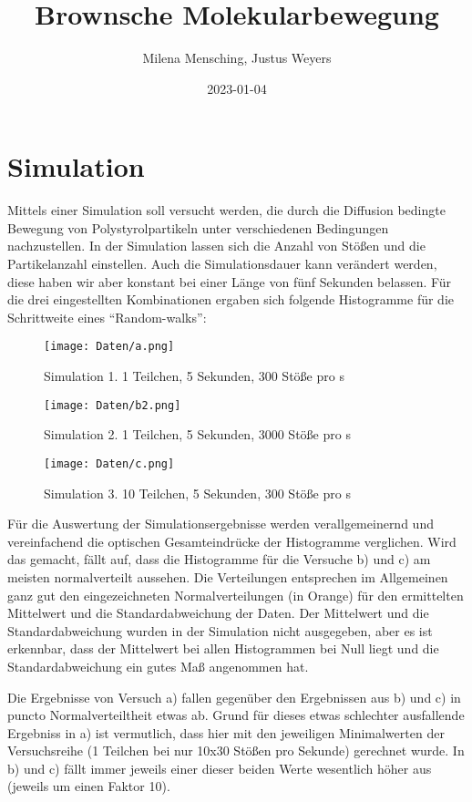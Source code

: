 \documentclass[class=article, crop=false]{standalone}
\title{Brownsche Molekularbewegung}
\author{Milena Mensching, Justus Weyers}
\date{2023-01-04}
\begin{document}
\hypertarget{simulation}{%
\section{Simulation}\label{simulation}}

Mittels einer Simulation soll versucht werden, die durch die Diffusion
bedingte Bewegung von Polystyrolpartikeln unter verschiedenen
Bedingungen nachzustellen. In der Simulation lassen sich die Anzahl von
Stößen und die Partikelanzahl einstellen. Auch die Simulationsdauer kann
verändert werden, diese haben wir aber konstant bei einer Länge von fünf
Sekunden belassen. Für die drei eingestellten Kombinationen ergaben sich
folgende Histogramme für die Schrittweite eines ``Random-walks'':

\begin{figure}
\centering
\texttt{[image: Daten/a.png]}
\caption{Simulation 1. 1 Teilchen, 5 Sekunden, 300 Stöße pro s}
\end{figure}

\begin{figure}
\centering
\texttt{[image: Daten/b2.png]}
\caption{Simulation 2. 1 Teilchen, 5 Sekunden, 3000 Stöße pro s}
\end{figure}

\begin{figure}
\centering
\texttt{[image: Daten/c.png]}
\caption{Simulation 3. 10 Teilchen, 5 Sekunden, 300 Stöße pro s}
\end{figure}

Für die Auswertung der Simulationsergebnisse werden verallgemeinernd und
vereinfachend die optischen Gesamteindrücke der Histogramme verglichen.
Wird das gemacht, fällt auf, dass die Histogramme für die Versuche b)
und c) am meisten normalverteilt aussehen. Die Verteilungen entsprechen
im Allgemeinen ganz gut den eingezeichneten Normalverteilungen (in
Orange) für den ermittelten Mittelwert und die Standardabweichung der
Daten. Der Mittelwert und die Standardabweichung wurden in der
Simulation nicht ausgegeben, aber es ist erkennbar, dass der Mittelwert
bei allen Histogrammen bei Null liegt und die Standardabweichung ein
gutes Maß angenommen hat.

Die Ergebnisse von Versuch a) fallen gegenüber den Ergebnissen aus b)
und c) in puncto Normalverteiltheit etwas ab. Grund für dieses etwas
schlechter ausfallende Ergebniss in a) ist vermutlich, dass hier mit den
jeweiligen Minimalwerten der Versuchsreihe (1 Teilchen bei nur 10x30
Stößen pro Sekunde) gerechnet wurde. In b) und c) fällt immer jeweils
einer dieser beiden Werte wesentlich höher aus (jeweils um einen Faktor
10).
\end{document}
